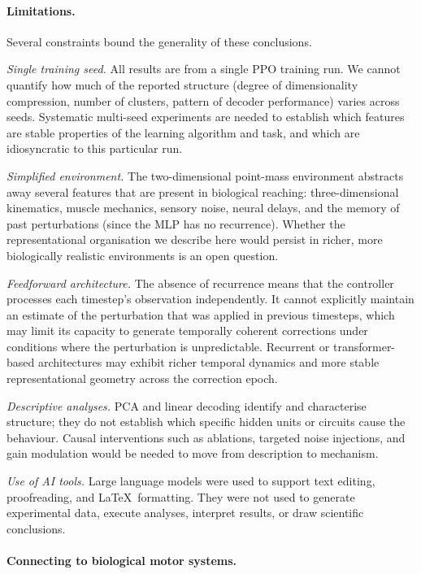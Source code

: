 \documentclass{article}
\begin{document}
\paragraph{Limitations.}

Several constraints bound the generality of these conclusions.

\textit{Single training seed.}
All results are from a single PPO training run.
We cannot quantify how much of the reported structure (degree of
dimensionality compression, number of clusters, pattern of decoder
performance) varies across seeds.
Systematic multi-seed experiments are needed to establish which features
are stable properties of the learning algorithm and task, and which are
idiosyncratic to this particular run.

\textit{Simplified environment.}
The two-dimensional point-mass environment abstracts away several features
that are present in biological reaching: three-dimensional kinematics, muscle
mechanics, sensory noise, neural delays, and the memory of past perturbations
(since the MLP has no recurrence).
Whether the representational organisation we describe here would persist
in richer, more biologically realistic environments is an open question.

\textit{Feedforward architecture.}
The absence of recurrence means that the controller processes each
timestep's observation independently.
It cannot explicitly maintain an estimate of the perturbation that was
applied in previous timesteps, which may limit its capacity to generate
temporally coherent corrections under conditions where the perturbation
is unpredictable.
Recurrent or transformer-based architectures may exhibit richer temporal
dynamics and more stable representational geometry across the correction
epoch.

\textit{Descriptive analyses.}
PCA and linear decoding identify and characterise structure; they do not
establish which specific hidden units or circuits cause the behaviour.
Causal interventions such as ablations, targeted noise injections, and gain
modulation would be needed to move from description to mechanism.

\textit{Use of AI tools.}
Large language models were used to support text editing, proofreading, and
\LaTeX\ formatting. They were not used to generate experimental data,
execute analyses, interpret results, or draw scientific conclusions.

\paragraph{Connecting to biological motor systems.}
\end{document}
